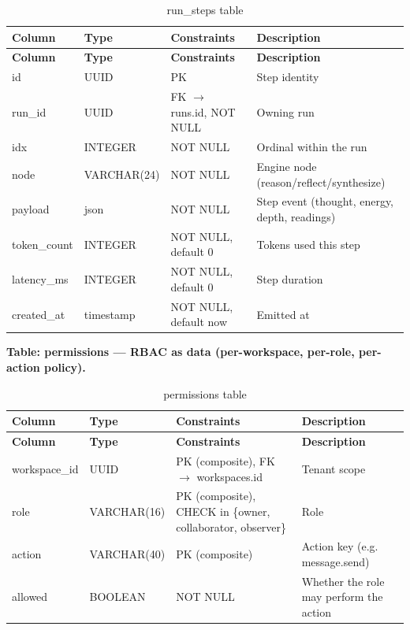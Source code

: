 \documentclass[12pt,a4paper]{report}
\begin{document}
\begingroup
\setlength{\parskip}{0pt}\renewcommand{\arraystretch}{1.32}\footnotesize
\begin{xltabular}{\textwidth}{>{\hsize\raggedright\arraybackslash}X >{\hsize\raggedright\arraybackslash}X >{\hsize\raggedright\arraybackslash}X >{\hsize\raggedright\arraybackslash}X}
\caption{run\_steps table}\\
\toprule
\textbf{Column} & \textbf{Type} & \textbf{Constraints} & \textbf{Description} \\
\midrule\endfirsthead
\toprule
\textbf{Column} & \textbf{Type} & \textbf{Constraints} & \textbf{Description} \\
\midrule\endhead
\bottomrule\endfoot
id & UUID & PK & Step identity \\
run\_id & UUID & FK $\rightarrow$ runs.id, NOT NULL & Owning run \\
idx & INTEGER & NOT NULL & Ordinal within the run \\
node & VARCHAR(24) & NOT NULL & Engine node (reason/reflect/synthesize) \\
payload & json & NOT NULL & Step event (thought, energy, depth, readings) \\
token\_count & INTEGER & NOT NULL, default 0 & Tokens used this step \\
latency\_ms & INTEGER & NOT NULL, default 0 & Step duration \\
created\_at & timestamp & NOT NULL, default now & Emitted at \\
\end{xltabular}
\endgroup

\noindent\textbf{Table: permissions --- RBAC as data (per-workspace, per-role, per-action policy).}

\begingroup
\setlength{\parskip}{0pt}\renewcommand{\arraystretch}{1.32}\footnotesize
\begin{xltabular}{\textwidth}{>{\hsize\raggedright\arraybackslash}X >{\hsize\raggedright\arraybackslash}X >{\hsize\raggedright\arraybackslash}X >{\hsize\raggedright\arraybackslash}X}
\caption{permissions table}\\
\toprule
\textbf{Column} & \textbf{Type} & \textbf{Constraints} & \textbf{Description} \\
\midrule\endfirsthead
\toprule
\textbf{Column} & \textbf{Type} & \textbf{Constraints} & \textbf{Description} \\
\midrule\endhead
\bottomrule\endfoot
workspace\_id & UUID & PK (composite), FK $\rightarrow$ workspaces.id & Tenant scope \\
role & VARCHAR(16) & PK (composite), CHECK in \{owner, collaborator, observer\} & Role \\
action & VARCHAR(40) & PK (composite) & Action key (e.g. message.send) \\
allowed & BOOLEAN & NOT NULL & Whether the role may perform the action \\
\end{xltabular}
\endgroup
\end{document}
